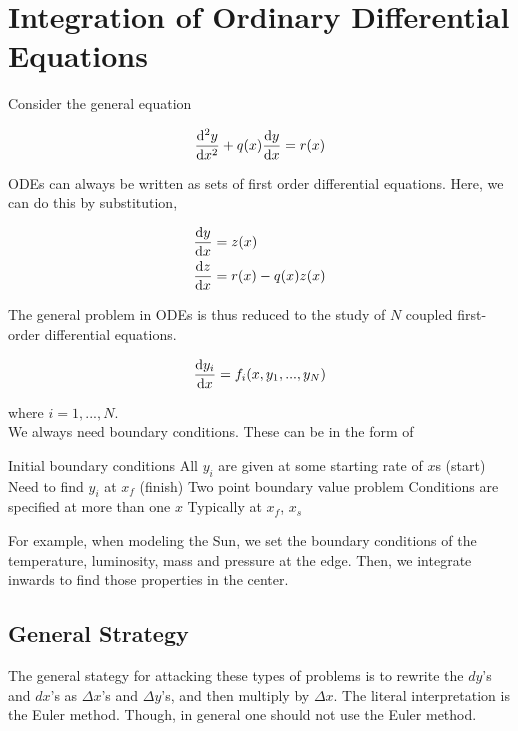 \documentclass[]{article}
\begin{document}
\section{Integration of Ordinary Differential Equations}\bigbreak\bigbreak


Consider the general equation

\begin{equation*}
	\dv[2]{y}{x} + q(x)\dv{y}{x} = r(x)
\end{equation*}

ODEs can always be written as sets of first order differential equations. Here, we can do this by substitution,

\begin{align*}
	\dv{y}{x} &= z(x)\\
	\dv{z}{x} &= r(x) - q(x)z(x)
\end{align*}

The general problem in ODEs is thus reduced to the study of $N$ coupled first-order differential equations.

\[\dv{y_i}{x} = f_i(x, y_1, ..., y_N)\]

where $i = 1, ..., N$.\\

We always need boundary conditions. These can be in the form of

\begin{outline}
	\1 Initial boundary conditions
		\2 All $y_i$ are given at some starting rate of $x$s (start)
		\2 Need to find $y_i$ at $x_f$ (finish)
	\1 Two point boundary value problem
		\2 Conditions are specified at more than one $x$
		\2 Typically at $x_f$, $x_s$
\end{outline}

For example, when modeling the Sun, we set the boundary conditions of the temperature, luminosity, mass and pressure at the edge. Then, we integrate inwards to find those properties in the center.\\

\subsection{General Strategy}\bigbreak

The general stategy for attacking these types of problems is to rewrite the $dy$'s and $dx$'s as $\Delta x$'s and $\Delta y$'s, and then multiply by $\Delta x$. The literal interpretation is the Euler method. Though, in general one should not use the Euler method.\\
\end{document}
